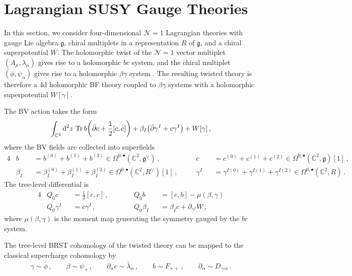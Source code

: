 \documentclass[11pt]{article}
\begin{document}
\section{Lagrangian SUSY Gauge Theories}
\label{sec:Lagrangians}
In this section, we consider four-dimensional $\mathcal{N}=1$ Lagrangian theories with gauge Lie algebra $\mathfrak{g}$, chiral multiplets in a representation $R$ of $\mathfrak{g}$, and a chiral superpotential $W$. The holomorphic twist of the $\mathcal{N}=1$ vector multiplet $(A_{\mu},\lambda_\alpha)$ gives rise to a holomorphic $bc$ system, and the chiral multiplet $(\phi, \psi_\alpha)$ gives rise to a holomorphic $\beta\gamma$ system \cite{Johansen:1994aw, Costello:2011np,Elliott:2020ecf}. The resulting twisted theory is therefore a 4d holomorphic BF theory coupled to $\beta\gamma$ systems with a holomorphic superpotential $W[\gamma]$. 

The BV action takes the form
\begin{align}
    \int_{\mathbb{C}^2} \dd^2 z\, \Tr b \qty(\bar\partial c + \frac{1}{2} [c,c]) + \beta_I \qty(\bar\partial \gamma^I + c\gamma^I) + W[\gamma]  \, , \label{eq:L}
\end{align}
where the BV fields are collected into superfields 
\begin{alignat}{4}
   & b 
    &&= b^{(0)}+b^{(1)}+b^{(2)} \in \Omega^{0,\bullet}(\mathbb{C}^2,\mathfrak{g}^\vee) \, , \quad 
    && c 
    &&= c^{(0)}+c^{(1)}+c^{(2)} \in \Omega^{0,\bullet}(\mathbb{C}^2,\mathfrak{g})[1]\,, \\
   & 
   \beta_I 
   &&= \beta_I^{(0)}+\beta_I^{(1)}+\beta_I^{(2)} \in \Omega^{0,\bullet}(\mathbb{C}^2,R^\vee)[1] \, , \quad 
   && \gamma^I 
   &&= \gamma^{I(0)}+\gamma^{I(1)}+\gamma^{I(2)} \in \Omega^{0,\bullet}(\mathbb{C}^2,R) \, .
\end{alignat}
The tree-level differential is
\begin{alignat}{4}
    & Q_0 c &&= \frac{1}{2}[c,c] \, , \qquad  && Q_0 b &&= [c,b] - \mu(\beta,\gamma) \\
    & Q_0 \gamma^I &&= c\gamma^I \, , \qquad  &&  Q_0 \beta_I &&= \beta_I c + \partial_{\gamma^I} W \, ,
\end{alignat}
where $\mu(\beta,\gamma)$ is the moment map generating the symmetry gauged by the $bc$ system.

The tree-level BRST cohomology of the twisted theory can be mapped to the classical supercharge cohomology by \cite{Saberi:2019ghy} 
\begin{align}
    \gamma \sim \bar{\phi} \, , \qquad \beta \sim \psi_{+} \, , \qquad \partial_{\dot\alpha} c \sim \bar\lambda_{\dot\alpha} \, , \qquad b\sim F_{++} \, , \qquad \partial_{\dot\alpha} \sim D_{+\dot\alpha} \, .
\end{align}
\end{document}
